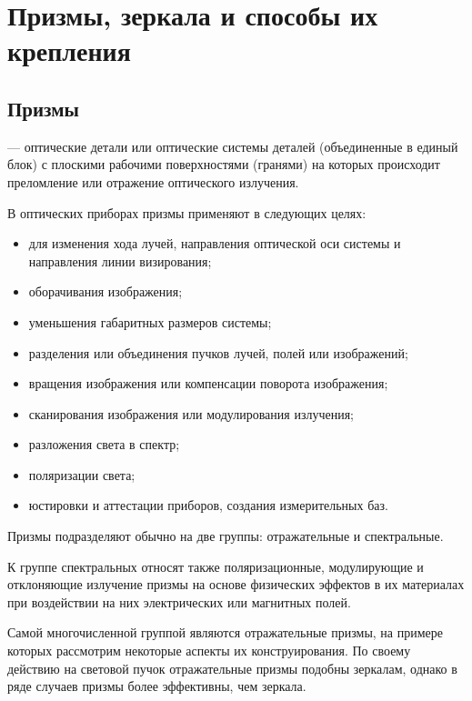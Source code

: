\chapter{Призмы, зеркала и способы их крепления}
\section{Призмы}

  --- оптические детали или оптические системы деталей (объединенные в единый блок) с плоскими рабочими поверхностями (гранями) на которых происходит преломление или отражение оптического излучения.

В оптических приборах призмы применяют в следующих целях:
\begin{itemize}
\item для изменения хода лучей, направления оптической оси системы и направления линии визирования;
\item оборачивания изображения;
\item уменьшения габаритных размеров системы;
\item разделения или объединения пучков лучей, полей или изображений;
\item вращения  изображения  или  компенсации  поворота изображения;
\item сканирования изображения или модулирования излучения;
\item разложения света в спектр;
\item поляризации света;
\item юстировки и аттестации приборов, создания измерительных баз.
\end{itemize}

Призмы подразделяют обычно на две группы: отражательные и спектральные. 

К группе спектральных относят также поляризационные, модулирующие и отклоняющие излучение призмы на основе физических эффектов в их материалах при воздействии на них электрических или магнитных полей.

Самой многочисленной группой являются отражательные призмы, на примере которых рассмотрим некоторые аспекты их конструирования.
По своему действию на световой пучок отражательные призмы подобны зеркалам, однако в ряде случаев призмы более эффективны, чем зеркала.

